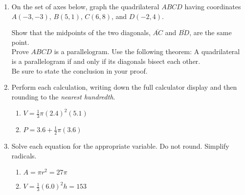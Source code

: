\begin{enumerate}
  \item On the set of axes below, graph the quadrilateral $ABCD$ having coordinates $A(-3,-3)$, $B(5,1)$, $C(6,8)$, and $D(-2,4)$.
    \begin{center} %
    \end{center}
    Show that the midpoints of the two diagonals, $\overline{AC}$ and $\overline{BD}$, are the same point. \\%
    Prove $ABCD$ is a parallelogram. Use the following theorem:
    A quadrilateral is a parallelogram if and only if its diagonals bisect each other. \\[0.5cm]
    Be sure to state the conclusion in your proof.








  
\newpage
\item Perform each calculation, writing down the full calculator display and then rounding to the \emph{nearest hundredth}.
\begin{multicols}{2}
\begin{enumerate}
  \item $V=\frac{1}{3} \pi (2.4)^2(5.1)$
  \item $P=3.6 + \frac{1}{2} \pi (3.6)$  
\end{enumerate}
\end{multicols}\vspace{2cm}

\item Solve each equation for the appropriate variable. Do not round. Simplify radicals.
\begin{multicols}{2}
\begin{enumerate}[itemsep=2cm]
  \item $A=\pi r^2=27\pi$
  \item $V=\frac{1}{3}(6.0)^2h=153$  
\end{enumerate}
\end{multicols}%


\end{enumerate}

